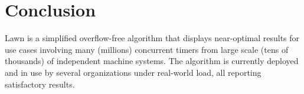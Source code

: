 \documentclass[twocolumn,a4paper]{article}
\begin{document}
\section{Conclusion}
Lawn is a simplified overflow-free algorithm that displays near-optimal results for use cases involving many (millions) concurrent timers from large scale (tens of thousands) of independent machine systems. 
The algorithm is currently deployed and in use by several organizations under real-world load, all reporting satisfactory results.




\end{document}
